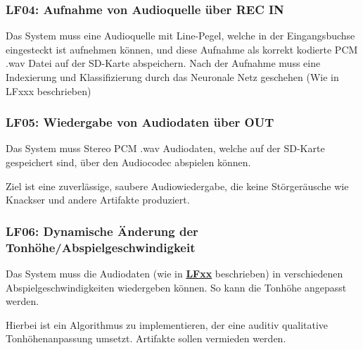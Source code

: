 
\subsubsection{LF04: Aufnahme von Audioquelle über REC IN}
\label{lf-audiorecord}

Das System muss eine Audioquelle mit Line-Pegel, welche in der Eingangsbuchse eingesteckt ist aufnehmen können, und diese Aufnahme als korrekt kodierte PCM .wav Datei auf der SD-Karte abspeichern. Nach der Aufnahme muss eine Indexierung und Klassifizierung durch das Neuronale Netz geschehen (Wie in LFxxx beschrieben)


\subsubsection{LF05: Wiedergabe von Audiodaten über OUT}
\label{lf-audioplayback}

Das System muss Stereo PCM .wav Audiodaten, welche auf der SD-Karte gespeichert sind, über den Audiocodec abspielen können.

Ziel ist eine zuverlässige, saubere Audiowiedergabe, die keine Störgeräusche wie Knackser und andere Artifakte produziert.

\subsubsection{LF06: Dynamische Änderung der Tonhöhe/Abspielgeschwindigkeit}
\label{lf-pitchaudio}

Das System muss die Audiodaten (wie in \textbf{\hyperlink{lf-audioplayback}{LFxx}} beschrieben) in verschiedenen Abspielgeschwindigkeiten wiedergeben können. So kann die Tonhöhe angepasst werden.

Hierbei ist ein Algorithmus zu implementieren, der eine auditiv qualitative Tonhöhenanpassung umsetzt. Artifakte sollen vermieden werden.